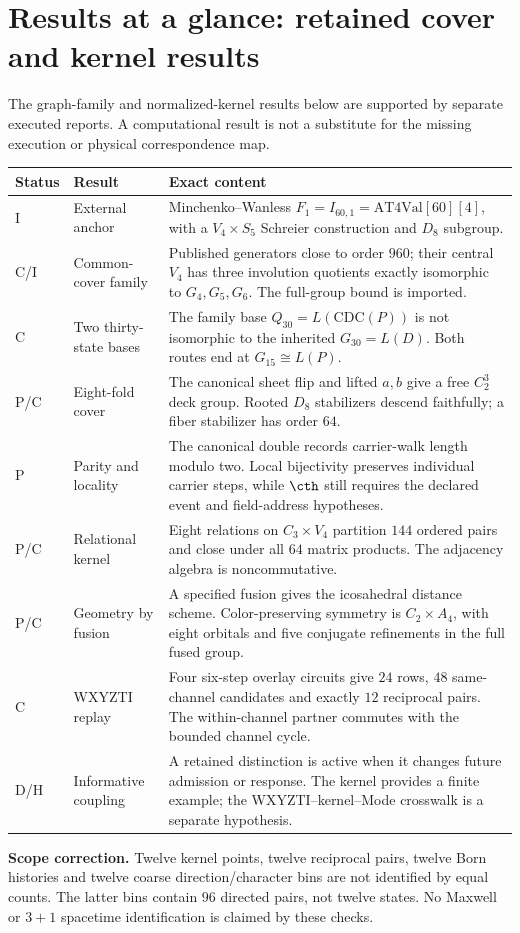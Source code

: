 \section*{Results at a glance: retained cover and kernel results}
The graph-family and normalized-kernel results below are supported by separate executed reports. A computational result is not a substitute for the missing execution or physical correspondence map.

\noindent\begin{tabularx}{\textwidth}{@{}p{}p{}X@{}}
\toprule Status & Result & Exact content \\\midrule
I & External anchor & Minchenko--Wanless $F_1=I_{60,1}=\mathrm{AT4Val}[60][4]$, with a $V_4\times S_5$ Schreier construction and $D_8$ subgroup. \\[5pt]
C/I & Common-cover family & Published generators close to order $960$; their central $V_4$ has three involution quotients exactly isomorphic to $G_4,G_5,G_6$. The full-group bound is imported. \\[5pt]
C & Two thirty-state bases & The family base $Q_{30}=L(\mathrm{CDC}(P))$ is not isomorphic to the inherited $G_{30}=L(D)$. Both routes end at $G_{15}\cong L(P)$. \\[5pt]
P/C & Eight-fold cover & The canonical sheet flip and lifted $a,b$ give a free $C_2^3$ deck group. Rooted $D_8$ stabilizers descend faithfully; a fiber stabilizer has order $64$. \\[5pt]
P & Parity and locality & The canonical double records carrier-walk length modulo two. Local bijectivity preserves individual carrier steps, while $\cth$ still requires the declared event and field-address hypotheses. \\[5pt]
P/C & Relational kernel & Eight relations on $C_3\times V_4$ partition $144$ ordered pairs and close under all $64$ matrix products. The adjacency algebra is noncommutative. \\[5pt]
P/C & Geometry by fusion & A specified fusion gives the icosahedral distance scheme. Color-preserving symmetry is $C_2\times A_4$, with eight orbitals and five conjugate refinements in the full fused group. \\[5pt]
C & WXYZTI replay & Four six-step overlay circuits give $24$ rows, $48$ same-channel candidates and exactly $12$ reciprocal pairs. The within-channel partner commutes with the bounded channel cycle. \\[5pt]
D/H & Informative coupling & A retained distinction is active when it changes future admission or response. The kernel provides a finite example; the WXYZTI--kernel--Mode crosswalk is a separate hypothesis. \\
\bottomrule
\end{tabularx}

\medskip
\noindent\textbf{Scope correction.} Twelve kernel points, twelve reciprocal pairs, twelve Born histories and twelve coarse direction/character bins are not identified by equal counts. The latter bins contain $96$ directed pairs, not twelve states. No Maxwell or $3+1$ spacetime identification is claimed by these checks.
